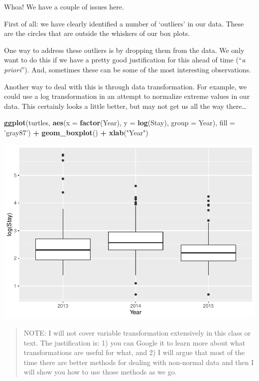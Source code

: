 \documentclass[
]{book}
\newenvironment{Shaded}{\begin{snugshade}}{\end{snugshade}}
\newcommand{\DataTypeTok}[1]{\textcolor[rgb]{0.13,0.29,0.53}{#1}}
\newcommand{\KeywordTok}[1]{\textcolor[rgb]{0.13,0.29,0.53}{\textbf{#1}}}
\newcommand{\NormalTok}[1]{#1}
\newcommand{\OperatorTok}[1]{\textcolor[rgb]{0.81,0.36,0.00}{\textbf{#1}}}
\newcommand{\StringTok}[1]{\textcolor[rgb]{0.31,0.60,0.02}{#1}}
\begin{document}
Whoa! We have a couple of issues here.

First of all: we have clearly identified a number of `outliers' in our data. These are the circles that are outside the whiskers of our box plots.

One way to address these outliers is by dropping them from the data. We only want to do this if we have a pretty good justification for this ahead of time (``\emph{a priori}''). And, sometimes these can be some of the most interesting observations.

Another way to deal with this is through data transformation. For example, we could use a log transformation in an attempt to normalize extreme values in our data. This certainly looks a little better, but may not get us all the way there\ldots{}

\begin{Shaded}
\begin{Highlighting}[]
\KeywordTok{ggplot}\NormalTok{(turtles, }
       \KeywordTok{aes}\NormalTok{(}\DataTypeTok{x =} \KeywordTok{factor}\NormalTok{(Year), }\DataTypeTok{y =} \KeywordTok{log}\NormalTok{(Stay), }\DataTypeTok{group =}\NormalTok{ Year), }
       \DataTypeTok{fill =} \StringTok{'gray87'}\NormalTok{) }\OperatorTok{+}
\StringTok{  }\KeywordTok{geom_boxplot}\NormalTok{() }\OperatorTok{+}
\StringTok{  }\KeywordTok{xlab}\NormalTok{(}\StringTok{"Year"}\NormalTok{)}
\end{Highlighting}
\end{Shaded}

\includegraphics{worstr_files/figure-latex/unnamed-chunk-230-1.pdf}

\begin{quote}
NOTE: I will not cover variable transformation extensively in this class or text. The justification is: 1) you can Google it to learn more about what transformations are useful for what, and 2) I will argue that most of the time there are better methods for dealing with non-normal data and then I will show you how to use those methods as we go.
\end{quote}
\end{document}
